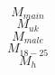 \documentclass[a4paper,12pt,twoside,openright]{report}\usepackage{epsfig,graphicx,parskip,setspace,tabularx,xspace,verbatim,amssymb,algorithm,url,graphicx,caption,subcaption,amsmath,listings,color,enumitem,afterpage,amsfonts}
\begin{document}
$$ M_{main}$$
$$ M_{uk}$$
$$ M_{male}$$
$$ M_{18-25}$$
$$ M_{h}$$
\end{document}
